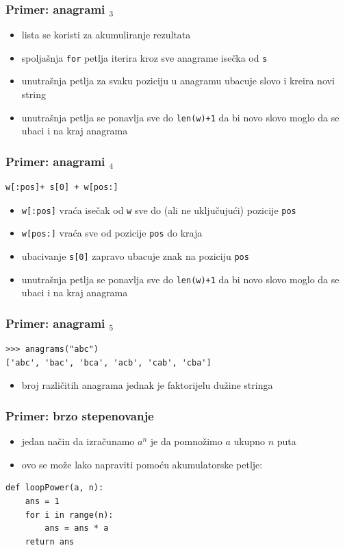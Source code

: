 \documentclass[utf8,compress,aspectratio=169]{beamer}
\begin{document}
\begin{frame}[fragile]
  \frametitle{Primer: anagrami $_3$}
  \begin{itemize}
    \item lista se koristi za akumuliranje rezultata
    \item spoljašnja \texttt{for} petlja iterira kroz sve anagrame isečka od \texttt{s}
    \item unutrašnja petlja za svaku poziciju u anagramu ubacuje slovo i kreira novi string
    \item unutrašnja petlja se ponavlja sve do \texttt{len(w)+1} da bi novo slovo moglo da se ubaci i na kraj anagrama
  \end{itemize}
\end{frame}

\begin{frame}[fragile]
  \frametitle{Primer: anagrami $_4$}
\begin{verbatim}
w[:pos]+ s[0] + w[pos:]
\end{verbatim}
  \begin{itemize}
    \item \texttt{w[:pos]} vraća isečak od \texttt{w} sve do (ali ne uključujući) pozicije \texttt{pos}
    \item \texttt{w[pos:]} vraća sve od pozicije \texttt{pos} do kraja
    \item ubacivanje \texttt{s[0]} zapravo ubacuje znak na poziciju \texttt{pos}
    \item unutrašnja petlja se ponavlja sve do \texttt{len(w)+1} da bi novo slovo moglo da se ubaci i na kraj anagrama
  \end{itemize}
\end{frame}

\begin{frame}[fragile]
  \frametitle{Primer: anagrami $_5$}
\begin{verbatim}
>>> anagrams("abc")
['abc', 'bac', 'bca', 'acb', 'cab', 'cba']
\end{verbatim}
  \begin{itemize}
    \item broj različitih anagrama jednak je faktorijelu dužine stringa
  \end{itemize}
\end{frame}

\begin{frame}[fragile]
  \frametitle{Primer: brzo stepenovanje}
  \begin{itemize}
    \item jedan način da izračunamo $a^n$ je da pomnožimo $a$ ukupno $n$ puta
    \item ovo se može lako napraviti pomoću akumulatorske petlje:
  \end{itemize}
\begin{verbatim}
def loopPower(a, n):
    ans = 1
    for i in range(n):
        ans = ans * a
    return ans
\end{verbatim}
\end{frame}
\end{document}
